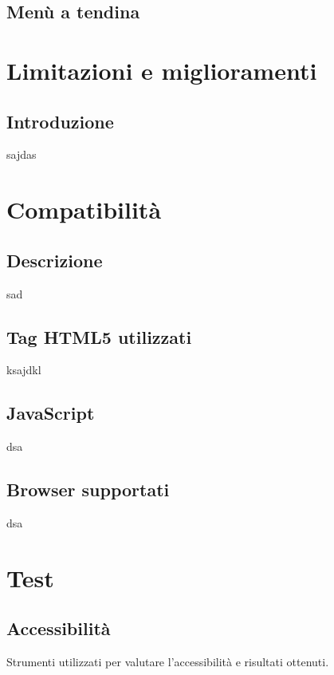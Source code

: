 \documentclass[12pt]{article}
\begin{document}
	\subsection{Menù a tendina}
	
	\section{Limitazioni e miglioramenti}
	\subsection{Introduzione}
	sajdas
	
	\section{Compatibilità}
	\subsection{Descrizione}
	sad
	\subsection{Tag HTML5 utilizzati}
	ksajdkl
	\subsection{JavaScript}
	dsa
	\subsection{Browser supportati}
	dsa
	
	\section{Test}
	\subsection{Accessibilità}
	Strumenti utilizzati per valutare l'accessibilità e risultati ottenuti.
\end{document}
